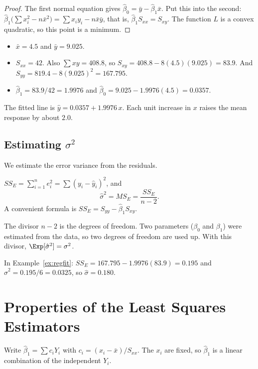 \begin{proof}
The first normal equation gives $\hat\beta_0=\bar{y}-\hat\beta_1\bar{x}$. Put this into the second: $\hat\beta_1\big(\sum x_i^2-n\bar{x}^2\big)=\sum x_iy_i-n\bar{x}\bar{y}$, that is, $\hat\beta_1S_{xx}=S_{xy}$. The function $L$ is a convex quadratic, so this point is a minimum.
\end{proof}

\begin{example}\label{ex:regfit}
\begin{itemize}
  \item $\bar{x}=4.5$ and $\bar{y}=9.025$.
  \item $S_{xx}=42$. Also $\sum xy=408.8$, so $S_{xy}=408.8-8(4.5)(9.025)=83.9$. And $S_{yy}=819.4-8(9.025)^2=167.795$.
  \item $\hat\beta_1=83.9/42=1.9976$ and $\hat\beta_0=9.025-1.9976(4.5)=0.0357$.
\end{itemize}
The fitted line is $\hat{y}=0.0357+1.9976\,x$. Each unit increase in $x$ raises the mean response by about $2.0$.
\end{example}

\subsection*{Estimating $\sigma^2$}

We estimate the error variance from the residuals.

\begin{definition}
$SS_E=\sum_{i=1}^ne_i^2=\sum(y_i-\hat{y}_i)^2$, and
\[ \hat\sigma^2=MS_E=\frac{SS_E}{n-2}. \]
A convenient formula is $SS_E=S_{yy}-\hat\beta_1S_{xy}$.
\end{definition}

The divisor $n-2$ is the degrees of freedom. Two parameters ($\beta_0$ and $\beta_1$) were estimated from the data, so two degrees of freedom are used up. With this divisor, $\Exp[\hat\sigma^2]=\sigma^2$.

In Example~\ref{ex:regfit}: $SS_E=167.795-1.9976(83.9)=0.195$ and $\hat\sigma^2=0.195/6=0.0325$, so $\hat\sigma=0.180$.

\section{Properties of the Least Squares Estimators}

Write $\hat\beta_1=\sum c_iY_i$ with $c_i=(x_i-\bar{x})/S_{xx}$. The $x_i$ are fixed, so $\hat\beta_1$ is a linear combination of the independent $Y_i$.

